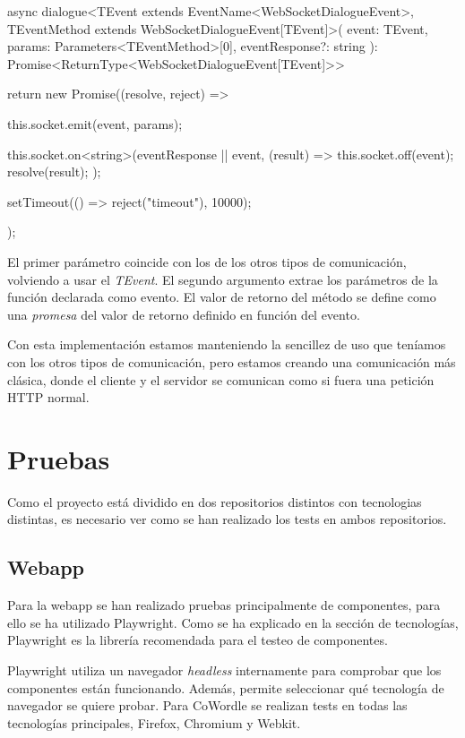 \begin{mytypescript}[float={!h},caption={Implementación del método \textit{dialogue}.},label={alg:etiqueta}]
	async dialogue<TEvent extends EventName<WebSocketDialogueEvent>, TEventMethod extends WebSocketDialogueEvent[TEvent]>(
	event: TEvent,
	params: Parameters<TEventMethod>[0],
	eventResponse?: string
	): Promise<ReturnType<WebSocketDialogueEvent[TEvent]>> {
		return new Promise((resolve, reject) => {
			this.socket.emit(event, params);

			this.socket.on<string>(eventResponse || event, (result) => {
				this.socket.off(event);
				resolve(result);
			});

			setTimeout(() => reject("timeout"), 10000);
		});
	}
\end{mytypescript}

El primer parámetro coincide con los de los otros tipos de comunicación, volviendo a usar el \textit{TEvent}. El segundo argumento extrae los parámetros de la función declarada como evento. El valor de retorno del método se define como una \textit{promesa} del valor de retorno definido en función del evento.

Con esta implementación estamos manteniendo la sencillez de uso que teníamos con los otros tipos de comunicación, pero estamos creando una comunicación más clásica, donde el cliente y el servidor se comunican como si fuera una petición HTTP normal.


\section{Pruebas}

Como el proyecto está dividido en dos repositorios distintos con tecnologias distintas, es necesario ver como se han realizado los tests en ambos repositorios.

\subsection{Webapp}
Para la webapp se han realizado pruebas principalmente de componentes, para ello se ha utilizado Playwright. Como se ha explicado en la sección de tecnologías, Playwright es la librería recomendada para el testeo de componentes.

Playwright utiliza un navegador \textit{headless} internamente para comprobar que los componentes están funcionando. Además, permite seleccionar qué tecnología de navegador se quiere probar. Para CoWordle se realizan tests en todas las tecnologías principales, Firefox, Chromium y Webkit.

